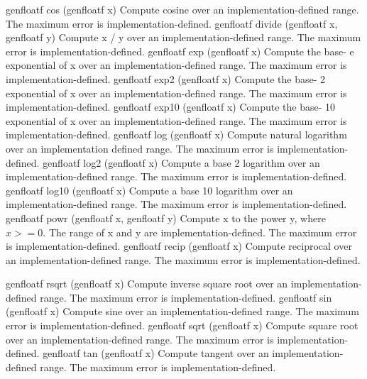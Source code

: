 

\addRow
{
genfloatf cos (genfloatf x)
}
{
Compute cosine over an implementation-defined range.
The maximum error is implementation-defined.
}
\addRow
{
genfloatf divide (genfloatf x, genfloatf y)
}
{
Compute x / y over an implementation-defined range.
The maximum error is implementation-defined.
}
\addRow
{
genfloatf exp (genfloatf x)
}
{
 Compute the base- e exponential of x over an
implementation-defined range. The maximum error is
implementation-defined.
}
\addRow
{
genfloatf exp2 (genfloatf x)
}
{
Compute the base- 2 exponential of x over an
implementation-defined range. The maximum error is
implementation-defined.
}
\addRow
{
genfloatf exp10 (genfloatf x)
}
{
 Compute the base- 10 exponential of x over an
implementation-defined range. The maximum error is
implementation-defined.
}
\addRow
{
genfloatf log (genfloatf x)
}
{
 Compute natural logarithm over an implementation defined range.
 The maximum error is implementation-defined.
 }
\addRow
{
 genfloatf log2 (genfloatf x)
 }
 {
 Compute a base 2 logarithm over an implementation-defined
range. The maximum error is implementation-defined.
}
\addRow
{
genfloatf log10 (genfloatf x)
}
{
Compute a base 10 logarithm over an implementation-defined
range. The maximum error is implementation-defined.
}
\addRow
{
genfloatf powr (genfloatf x, genfloatf y)
}
{
Compute x to the power y, where $ x > = 0$. The range of
x and y are implementation-defined. The maximum error
is implementation-defined.
}
\addRow
{
genfloatf recip (genfloatf x)
}
{
Compute reciprocal over an implementation-defined
range. The maximum error is implementation-defined.
}

\addRow
{
genfloatf rsqrt (genfloatf x)
}
{
Compute inverse square root over an implementation-defined
range. The maximum error is implementation-defined.
}
\addRow
{
genfloatf sin (genfloatf x)
}
{
 Compute sine over an implementation-defined range.
The maximum error is implementation-defined.
}
\addRow
{
genfloatf sqrt (genfloatf x)
}
{
Compute square root over an implementation-defined
range. The maximum error is implementation-defined.
}
\addRow
{
genfloatf tan (genfloatf x)
}
{
Compute tangent over an implementation-defined range.
The maximum error is implementation-defined.
}
\completeTable

